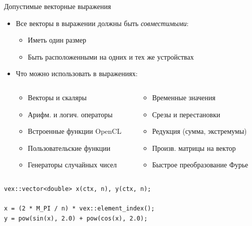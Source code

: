 \documentclass[@BEAMER_OPTIONS@]{beamer}
\begin{document}
\begin{frame}[fragile]{Допустимые векторные выражения}
    \begin{itemize}
        \item Все векторы в выражении должны быть \emph{совместимыми}:
            \begin{itemize}
                \item Иметь один размер
                \item Быть расположенными на одних и тех же устройствах
            \end{itemize}
        \item Что можно использовать в выражениях:
            \begin{columns}
                \begin{column}{0.4\textwidth}
                    \begin{itemize}
                        \item Векторы и скаляры
                        \item Арифм. и логич. операторы
                        \item Встроенные функции OpenCL
                        \item Пользовательские функции
                        \item Генераторы случайных чисел
                    \end{itemize}
                \end{column}
                \begin{column}{0.4\textwidth}
                    \begin{itemize}
                        \item Временные значения
                        \item Срезы и перестановки
                        \item Редукция (сумма, экстремумы)
                        \item Произв. матрицы на вектор
                        \item Быстрое преобразование Фурье
                    \end{itemize}
                \end{column}
            \end{columns}
    \end{itemize}
    \begin{exampleblock}{}
        \begin{lstlisting}
vex::vector<double> x(ctx, n), y(ctx, n);

x = (2 * M_PI / n) * vex::element_index();
y = pow(sin(x), 2.0) + pow(cos(x), 2.0);
        \end{lstlisting}
    \end{exampleblock}
\end{frame}
\end{document}
